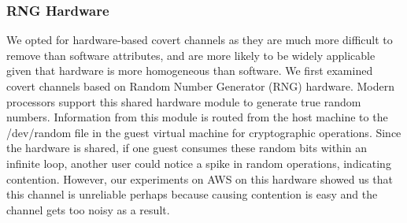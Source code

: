 
\subsubsection{RNG Hardware}
We opted for hardware-based covert channels as they are much more difficult to 
remove than software attributes, and are more likely to be widely applicable 
given that hardware is more homogeneous than software. We first examined 
covert channels based on Random Number Generator (RNG) hardware\cite{evtyushkinccs2016}.
Modern processors support this shared hardware module to generate true random numbers. 
Information from this module is routed from the host machine to the /dev/random file 
in the guest virtual machine for cryptographic operations. Since the hardware is shared, 
if one guest consumes these random bits within an infinite loop, another user could 
notice a spike in random operations, indicating contention. However, our experiments on 
AWS on this hardware showed us that this channel is unreliable perhaps because
causing contention is easy and the channel gets too noisy as a result.



